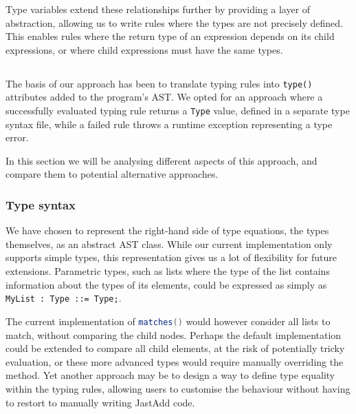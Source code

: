 \documentclass[nofilelist]{cslthse-msc}
\newcommand{\CR}[1]{\textcolor{green!60!black}{[\textbf{CR}:#1]}}
\begin{document}
Type variables extend these relationships further by providing a layer of abstraction, allowing us to write rules where the types are not precisely defined.
This enables rules where the return type of an expression depends on its child expressions, or where child expressions must have the same types.

%
%

\subsection{\rqtwo}
The basis of our approach has been to translate typing rules into \lstinline{type()} attributes added to the program's AST.
We opted for an approach where a successfully evaluated typing rule returns a \lstinline{Type} value, defined in a separate type syntax file, while a failed rule throws a runtime exception representing a type error.

In this section we will be analysing different aspects of this approach, and compare them to potential alternative approaches.

\subsubsection{Type syntax}
We have chosen to represent the right-hand side of type equations, the types themselves, as an abstract AST class.
While our current implementation only supports simple types, this representation gives us a lot of flexibility for future extensions.
Parametric types, such as lists where the type of the list contains information about the types of its elements, could be expressed as simply as \lstinline{MyList : Type ::= Type;}.

The current implementation of \lstinline[language=java]{matches()} would however consider all lists to match, without comparing the child nodes.
Perhaps the default implementation could be extended to compare all child elements, at the risk of potentially tricky evaluation, or these more advanced types would require manually overriding the method.
Yet another approach may be to design a way to define type equality within the typing rules, allowing users to customise the behaviour without having to restort to manually writing JastAdd code.
\end{document}

